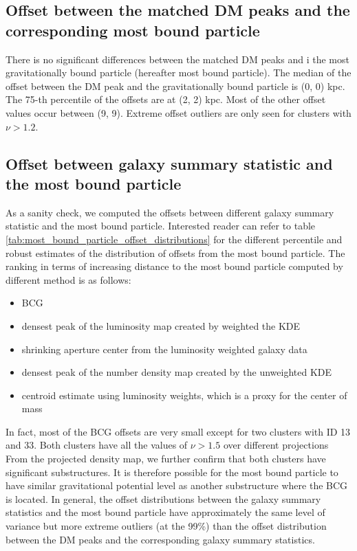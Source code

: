 \subsection{Offset between the matched DM peaks and the corresponding most
bound particle}
There is no significant differences between the matched DM peaks and i
the most gravitationally 
bound particle (hereafter most bound particle).
The median of the offset between the DM peak and the gravitationally bound
particle is (0, 0) kpc. The 75-th percentile of the offsets are at (2, 2) kpc. 
Most of the other offset values occur between (9, 9). Extreme offset outliers
are only seen for clusters with $\nu > 1.2$. 


\subsection{Offset between galaxy summary statistic and the most bound particle}
As a sanity check, we computed the offsets between different galaxy summary
statistic and the most bound particle. 
Interested reader can refer to table
\ref{tab:most_bound_particle_offset_distributions} for the different
percentile and robust estimates of the distribution of offsets from the most bound 
particle. 
The ranking in terms of increasing distance 
to the most bound particle computed by different method is as follows:
\begin{itemize}
	\item BCG 
	\item densest peak of the luminosity map created by weighted the KDE 
		\item shrinking aperture center from the luminosity weighted galaxy data
		\item densest peak of the number density map created by the unweighted KDE 
		\item centroid estimate using luminosity weights, which is a proxy for the
			center of mass
\end{itemize}

In fact, most of the BCG offsets are very small except for two clusters with ID 13
and 33. Both clusters have all the values  of $\nu > 1.5 $ over different projections  
From the projected density map, we further confirm that
both clusters have significant substructures. It is therefore possible for the
most bound particle to have similar gravitational potential level as another 
substructure where the BCG is located. 
In general, the offset distributions between the galaxy summary statistics and
the most bound particle have approximately the same level of variance but more
extreme outliers (at the 99\%) than the
offset distribution between the DM peaks and the corresponding galaxy summary
statistics.

